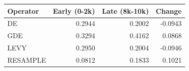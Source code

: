 \begin{tabular}{lrrr}
\toprule
Operator & Early (0-2k) & Late (8k-10k) & Change \\
\midrule
DE & 0.2944 & 0.2002 & -0.0943 \\
GDE & 0.3294 & 0.4162 & 0.0868 \\
LEVY & 0.2950 & 0.2004 & -0.0946 \\
RESAMPLE & 0.0812 & 0.1833 & 0.1021 \\
\bottomrule
\end{tabular}
